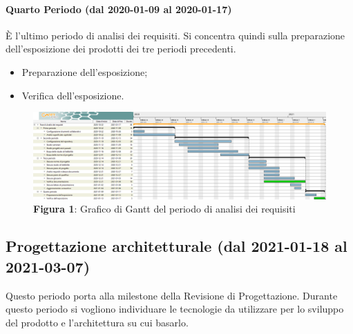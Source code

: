 \paragraph{Quarto Periodo (dal 2020-01-09 al 2020-01-17)}
È l'ultimo periodo di analisi dei requisiti. Si concentra quindi sulla preparazione dell'esposizione dei prodotti dei tre periodi precedenti.
\begin{itemize}
	\item Preparazione dell'esposizione;
	\item Verifica dell'esposizione.
\end{itemize}


\begin{landscape}
	\begin{figure}[H]
		\centering
		\includegraphics[width=\linewidth]{res/images/ganttFase1.png}
		\caption*{\textbf{Figura 1}{: Grafico di Gantt del periodo di analisi dei requisiti}}
		\label{fig:Gantt Analisi dei requisiti}
	\end{figure}
\end{landscape}




\subsection{Progettazione architetturale (dal 2021-01-18 al 2021-03-07)}

Questo periodo porta alla milestone della Revisione di Progettazione.
Durante questo periodo si vogliono individuare le tecnologie da utilizzare per lo sviluppo del prodotto e l'architettura su cui basarlo.

